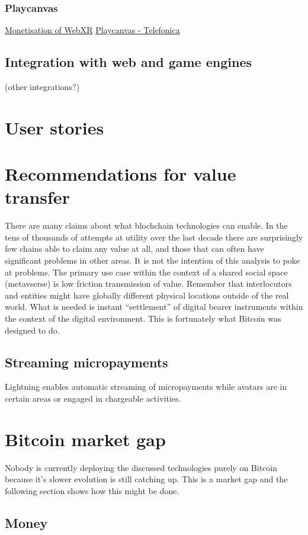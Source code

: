 \subsubsection{Playcanvas}
\href{https://hackmd.io/@XR/monetization}{Monetisation of WebXR}
\href{https://github.com/playcanvas/engine}{Playcanvas - Telefonica}
\subsection{Integration with web and game engines} (other integrations?) 
\section{User stories}
\section{Recommendations for value transfer}
There are many claims about what blochchain technologies can enable. In the tens of thousands of attempts at utility over the last decade there are surprisingly few chains able to claim any value at all, and those that can often have significant problems in other areas. It is not the intention of this analysis to poke at problems. The primary use case within the context of a shared social space (metavserse) is low friction transmission of value. Remember that interlocutors and entities might have globally different physical locations outside of the real world. What is needed is instant ``settlement'' of digital bearer instruments within the context of the digital environment. This is fortunately what Bitcoin was designed to do. 
\subsection{Streaming micropayments}
Lightning enables automatic streaming of micropayments while avatars are in certain areas or engaged in chargeable activities.

\section{Bitcoin market gap}
Nobody is currently deploying the discussed technologies purely on Bitcoin because it's slower evolution is still catching up. This is a market gap and the following section shows how this might be done.
\subsection{Money}
